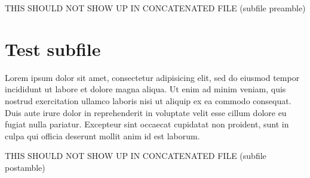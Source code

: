 
THIS SHOULD NOT SHOW UP IN CONCATENATED FILE (subfile preamble)





\chapter{Test subfile}

Lorem ipsum dolor sit amet, consectetur adipisicing elit, sed do eiusmod
tempor incididunt ut labore et dolore magna aliqua. Ut enim ad minim veniam,
quis nostrud exercitation ullamco laboris nisi ut aliquip ex ea commodo
consequat. Duis aute irure dolor in reprehenderit in voluptate velit esse
cillum dolore eu fugiat nulla pariatur. Excepteur sint occaecat cupidatat non
proident, sunt in culpa qui officia deserunt mollit anim id est laborum.




THIS SHOULD NOT SHOW UP IN CONCATENATED FILE (subfile postamble)
